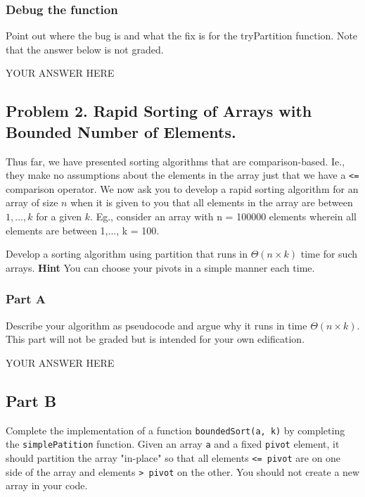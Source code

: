 \documentclass[
]{article}
\begin{document}
\hypertarget{debug-the-function}{%
\subsubsection{Debug the function}\label{debug-the-function}}

Point out where the bug is and what the fix is for the tryPartition
function. Note that the answer below is not graded.

YOUR ANSWER HERE

\hypertarget{problem-2-rapid-sorting-of-arrays-with-bounded-number-of-elements}{%
\subsection{Problem 2. Rapid Sorting of Arrays with Bounded Number of
Elements.}\label{problem-2-rapid-sorting-of-arrays-with-bounded-number-of-elements}}

Thus far, we have presented sorting algorithms that are
comparison-based. Ie., they make no assumptions about the elements in
the array just that we have a \texttt{\textless{}=} comparison operator.
We now ask you to develop a rapid sorting algorithm for an array of size
\(n\) when it is given to you that all elements in the array are between
\(1, \ldots, k\) for a given \(k\). Eg., consider an array with n =
100000 elements wherein all elements are between 1,..., k = 100.

Develop a sorting algorithm using partition that runs in
\(\Theta(n \times k)\) time for such arrays. \textbf{Hint} You can
choose your pivots in a simple manner each time.

\hypertarget{part-a}{%
\subsubsection{Part A}\label{part-a}}

Describe your algorithm as pseudocode and argue why it runs in time
\(\Theta(n \times k)\). This part will not be graded but is intended for
your own edification.

YOUR ANSWER HERE

\hypertarget{part-b}{%
\subsection{Part B}\label{part-b}}

Complete the implementation of a function \texttt{boundedSort(a,\ k)} by
completing the \texttt{simplePatition} function. Given an array
\texttt{a} and a fixed \texttt{pivot} element, it should partition the
array "in-place" so that all elements \texttt{\textless{}=\ pivot} are
on one side of the array and elements \texttt{\textgreater{}\ pivot} on
the other. You should not create a new array in your code.
\end{document}
